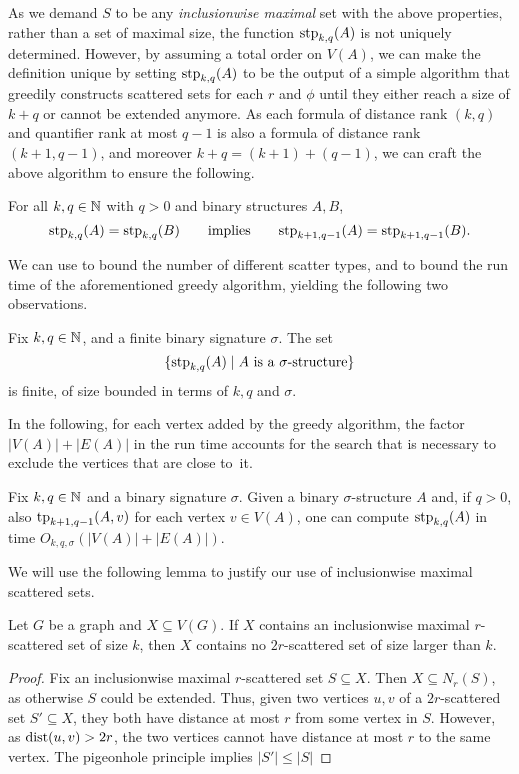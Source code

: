 As we demand \(S\) to be any \emph{inclusionwise maximal} set with the above properties, rather than a set of maximal size,
the function \(\textnormal{stp}_{k,q}(A)\) is not uniquely determined.
However, by assuming a total order on \(V(A)\),
we can make the definition unique by setting \(\textnormal{stp}_{k,q}(A)\) to be the output of a simple
algorithm that greedily constructs scattered sets for each \(r\) and \(\phi\)
until they either reach a size of \(k+q\) or cannot be extended anymore.
As each formula of distance rank \((k,q)\) and quantifier rank at most $q-1$ is also a formula of distance rank \((k+1,q-1)\),
and moreover \(k+q = (k+1)+(q-1)\),
we can craft the above algorithm to ensure the following.
\begin{observation}\label{obs:stphered}
    For all $k,q\in\mathbb N$ with $q>0$ and binary structures \(A,B\),
    $$\textnormal{stp}_{k,q}(A)= \textnormal{stp}_{k,q}(B)\qquad\text{implies}\qquad
    \textnormal{stp}_{k+1,q-1}(A)= \textnormal{stp}_{k+1,q-1}(B).$$
\end{observation}
We can use  to bound the number of different scatter types, and to bound the run time of the aforementioned greedy algorithm,
yielding the following two observations.
\begin{observation}\label{obs:scattertypebound}Fix $k,q\in\mathbb N$, and a finite binary signature $\sigma$.
    The set
    $$\{\textnormal{stp}_{k,q}(A)\mid{{A}}\text{ is a $\sigma$-structure}\}$$ is finite, of size bounded in terms of $k,q$ and $\sigma$.
\end{observation}

In the following, for each vertex added by the greedy algorithm, 
the factor \(|V(A)|+|E(A)|\) in the run time accounts for the search that is necessary to exclude the vertices that are close to~it.

\begin{observation}\label{obs:stpcompute}
    Fix $k,q\in\mathbb N$ and a binary signature $\sigma$.
    Given a binary $\sigma$-structure \(A\)
    and, if $q>0$, also \(\textnormal{tp}_{k+1,q-1}(A,v)\) for each vertex \(v \in V(A)\),
    one can compute \(\textnormal{stp}_{k,q}(A)\) in time \(O_{k,q,\sigma} (|V(A)|+|E(A)|)\).
\end{observation}

We will use the following lemma to justify our use of inclusionwise maximal scattered sets.

\begin{lemma}\label{lem:scattersizes}
    Let \(G\) be a graph and \(X \subseteq V(G)\).
    If \(X\) contains an inclusionwise maximal \(r\)-scattered set of size \(k\),
    then \(X\) contains no \(2r\)-scattered set of size larger than \(k\).
\end{lemma}
\begin{proof}
    Fix an inclusionwise maximal \(r\)-scattered set \(S \subseteq X\).
    Then \(X \subseteq N_{r}(S)\), as otherwise \(S\) could be extended.
    Thus, given two vertices \(u,v\) of a \(2r\)-scattered set \(S' \subseteq X\),
    they both have distance at most \(r\) from some vertex in \(S\).
    However, as \(\mathrm{dist}(u,v)>2r\),
    the two vertices cannot have distance at most \(r\) to the same vertex.
    The pigeonhole principle implies \(|S'| \le |S|\)
\end{proof}


